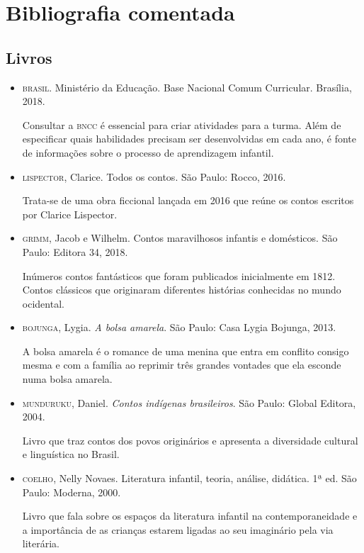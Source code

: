 \documentclass[11pt]{extarticle}
\begin{document}
\section{Bibliografia comentada}
\subsection{Livros}

\begin{itemize}
\item \textsc{brasil}. Ministério da Educação. Base Nacional Comum Curricular. Brasília, 2018.

Consultar a \textsc{bncc} é essencial para criar atividades para a turma. Além de especificar quais habilidades precisam ser desenvolvidas em cada ano, é fonte de informações sobre o processo de aprendizagem infantil. 

\item \textsc{lispector}, Clarice. Todos os contos. São Paulo: Rocco, 2016.

Trata-se de uma obra ficcional lançada em 2016 que reúne os contos escritos por Clarice Lispector. 
 
\item \textsc{grimm}, Jacob e Wilhelm. Contos maravilhosos infantis e domésticos. São Paulo: Editora 34, 2018.

Inúmeros contos fantásticos que foram publicados inicialmente em 1812. Contos clássicos que originaram diferentes histórias conhecidas no mundo ocidental.

\item \textsc{bojunga}, Lygia. \textit{A bolsa amarela}. São Paulo: Casa Lygia Bojunga, 2013.

A bolsa amarela é o romance de uma menina que entra em conflito consigo mesma e com a família ao reprimir três grandes vontades que ela esconde numa bolsa amarela.

\item \textsc{munduruku}, Daniel. \textit{Contos indígenas brasileiros}. São Paulo: Global Editora, 2004.

Livro que traz contos dos povos originários e apresenta a diversidade cultural e linguística no Brasil.

\item \textsc{coelho}, Nelly Novaes. Literatura infantil, teoria, análise, didática. 1ª ed. São Paulo: Moderna, 2000.

Livro que fala sobre os espaços da literatura infantil na contemporaneidade e a importância de as crianças estarem ligadas ao seu imaginário pela via literária.

\end{itemize}
\end{document}
